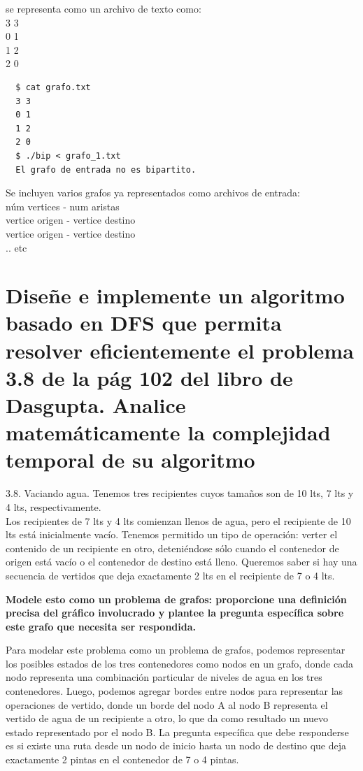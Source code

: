 \documentclass{article}
\begin{document}
se representa como un archivo de texto como:\\
3 3\\
0 1\\
1 2\\
2 0\\

\begin{commandline}
\begin{verbatim}
  $ cat grafo.txt
  3 3
  0 1
  1 2
  2 0
  $ ./bip < grafo_1.txt
  El grafo de entrada no es bipartito.
\end{verbatim}
\end{commandline}

Se incluyen varios grafos ya representados como archivos de entrada:\\
núm vertices - num aristas\\
vertice origen - vertice destino\\
vertice origen - vertice destino\\
.. etc\\

\newpage
\section{Diseñe e implemente un algoritmo basado en DFS que permita resolver eficientemente el problema 3.8 de la pág 102 del libro de Dasgupta. Analice matemáticamente la complejidad temporal de su algoritmo}

3.8. Vaciando agua. Tenemos tres recipientes cuyos tamaños son de 10 lts, 7 lts y 4 lts, respectivamente.\\
Los recipientes de 7 lts y 4 lts comienzan llenos de agua, pero el recipiente de 10 lts está inicialmente vacío. Tenemos permitido un tipo de operación: verter el contenido de un recipiente en otro, deteniéndose sólo cuando el contenedor de origen está vacío o el contenedor de destino está lleno. Queremos saber si hay una secuencia de vertidos que deja exactamente 2 lts en el recipiente de 7 o 4 lts.

\begin{question}
  \textbf{Modele esto como un problema de grafos: proporcione una definición precisa del gráfico involucrado y plantee la pregunta específica sobre este grafo que necesita ser respondida.}\\
\end{question}

Para modelar este problema como un problema de grafos, podemos representar los posibles estados de los tres contenedores como nodos en un grafo, donde cada nodo representa una combinación particular de niveles de agua en los tres contenedores. Luego, podemos agregar bordes entre nodos para representar las operaciones de vertido, donde un borde del nodo A al nodo B representa el vertido de agua de un recipiente a otro, lo que da como resultado un nuevo estado representado por el nodo B. La pregunta específica que debe responderse es si existe una ruta desde un nodo de inicio hasta un nodo de destino que deja exactamente 2 pintas en el contenedor de 7 o 4 pintas.\\
\end{document}
